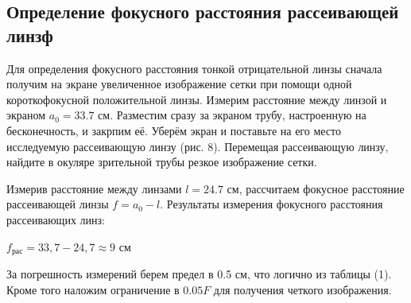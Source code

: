 \subsection{Определение фокусного расстояния рассеивающей линзф}

Для определения фокусного расстояния тонкой отрицательной линзы сначала получим на экране увеличенное изображение сетки при помощи одной короткофокусной положительной линзы. Измерим расстояние между линзой и экраном $a_0 = 33.7$ см.
Разместим сразу за экраном трубу, настроенную на бесконечность, и закрпим её. Уберём экран и поставьте на его место исследуемую рассеивающую линзу (рис. 8). Перемещая рассеивающую линзу, найдите в окуляре зрительной трубы резкое изображение сетки. \par
Измерив расстояние между линзами $l = 24.7$ см, рассчитаем фокусное расстояние рассеивающей линзы $f = a_0 - l$.
Результаты измерения фокусного расстояния рассеивающих линз:

\begin{center}
    $f_{рас} = 33,7 - 24,7 \approx 9$ см
\end{center}


За погрешность измерений берем предел в 0.5 см, что логично из таблицы (1). Кроме того наложим ограничение в $0.05F$ для получения четкого изображения.

